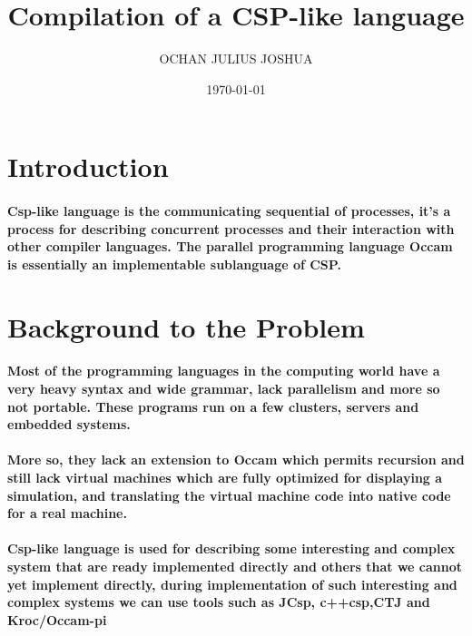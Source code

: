 \documentclass[dvips,12pt]{article}
\title{Compilation of a CSP-like language}
\author{OCHAN JULIUS JOSHUA}
\date{\today}
\begin{document}
	
	
	
	\maketitle
	
	\section{Introduction}
	
	\paragraph{ }
	
	\paragraph{Csp-like language is the communicating sequential of processes, it’s a process for describing concurrent processes and their interaction with other compiler languages. The parallel programming language Occam is essentially an implementable sublanguage of CSP.}
	
	
	\section{Background to the Problem }
	\paragraph{Most of the programming languages in the computing world have a very heavy syntax and wide grammar, lack parallelism and more so not portable. These programs run on a few clusters, servers and embedded systems.}
	
	
	\paragraph{More so, they lack an extension to Occam which permits recursion and still lack virtual machines which are fully optimized for displaying a simulation, and translating the virtual machine code into native code for a real machine.}
	\paragraph{Csp-like language is used for describing some interesting and complex system that are ready implemented directly and others that we cannot yet implement directly, during implementation of such interesting and complex systems we can use tools such as JCsp, c++csp,CTJ and Kroc/Occam-pi}
	  
\end{document}
